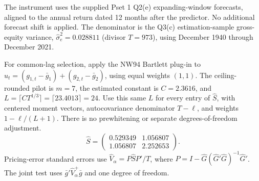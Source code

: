 The instrument uses the supplied Pset 1 Q2(e) expanding-window
forecasts, aligned to the annual return dated 12 months after the predictor.
No additional forecast shift is applied. The denominator is the Q3(c) estimation-sample
gross-equity variance, $\hat\sigma_e^2=0.028811$ (divisor $T=973$),
using December 1940 through December 2021.

For common-lag selection, apply the NW94 Bartlett plug-in to
$u_t=(g_{1,t}-\bar g_1)+(g_{2,t}-\bar g_2)$, using equal weights $(1,1)$.
The ceiling-rounded pilot is $m=7$, the estimated constant is
$C=2.3616$, and $L=\lceil CT^{1/3}\rceil=\lceil 23.4013\rceil=24$.
Use this same $L$ for every entry of $\hat S$, with centered moment vectors,
autocovariance denominator $T-\ell$, and weights $1-\ell/(L+1)$.
There is no prewhitening or separate degrees-of-freedom adjustment.
\[
\hat S=\begin{pmatrix} 0.529349 & 1.056807 \\ 1.056807 & 2.252653 \end{pmatrix}.
\]
Pricing-error standard errors use $\hat V_\alpha=P\hat S P'/T$,
where $P=I-\hat G(\hat G'\hat G)^{-1}\hat G'$.
The joint test uses $\bar g'\hat V_\alpha^+\bar g$ and one degree of freedom.
